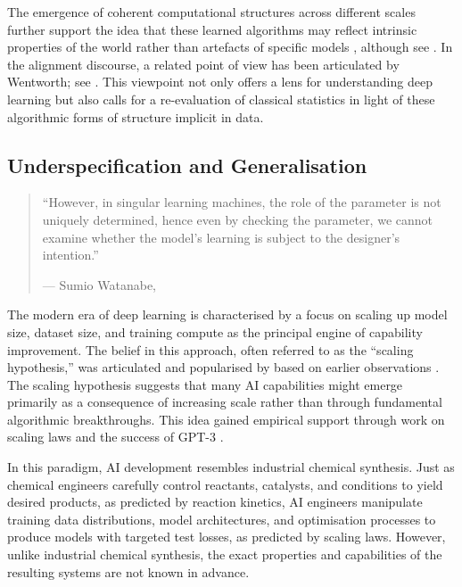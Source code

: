The emergence of coherent computational structures across different scales \citep{lieberum2023doescircuitanalysisinterpretability} further support the idea that these learned algorithms may reflect intrinsic properties of the world rather than artefacts of specific models \citep{huh2024platonic}, although see \citet{chughtai2023toymodeluniversalityreverse}. In the alignment discourse, a related point of view has been articulated by Wentworth; see \citet{natabs2023}. This viewpoint not only offers a lens for understanding deep learning but also calls for a re-evaluation of classical statistics in light of these algorithmic forms of structure implicit in data.



\subsection{Underspecification and Generalisation}\label{sec:underspecification}

\begin{quote}
``However, in singular learning machines, the role of the parameter is not uniquely determined, hence even by checking the parameter, we cannot examine whether the model’s learning is subject to the designer’s intention.''
\begin{flushright}
--- Sumio Watanabe, \citeyear[\S 3.4]{watanabe2024reviewprospectalgebraicresearch}

\end{flushright}
\end{quote}

The modern era of deep learning is characterised by a focus on scaling up model size, dataset size, and training compute as the principal engine of capability improvement. The belief in this approach, often referred to as the ``scaling hypothesis,'' was articulated and popularised by \citet{gwern2020scaling} based on earlier observations \citep{sutton2019bitter, amodei2018ai, raffel2020exploring}. The scaling hypothesis suggests that many AI capabilities might emerge primarily as a consequence of increasing scale rather than through fundamental algorithmic breakthroughs. This idea gained empirical support through work on scaling laws \citep{hestness2017deep, kaplan2020scaling} and the success of GPT-3 \citep{brown2020language,bommasani2021opportunities}.


In this paradigm, AI development resembles industrial chemical synthesis. Just as chemical engineers carefully control reactants, catalysts, and conditions to yield desired products, as predicted by reaction kinetics, AI engineers manipulate training data distributions, model architectures, and optimisation processes to produce models with targeted test losses, as predicted by scaling laws. However, unlike industrial chemical synthesis, the exact properties and capabilities of the resulting systems are not known in advance. 


